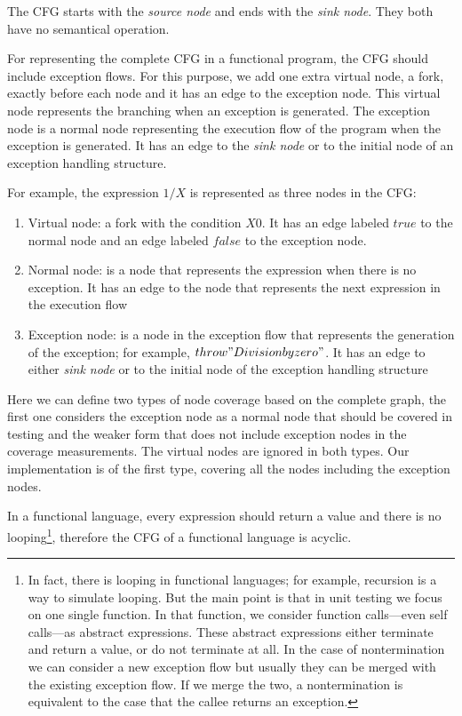 \documentclass[12pt,a4paper]{report}
\begin{document}
The CFG starts with the \emph{source node} and ends with the \emph{sink node}. They both have no semantical operation.

For representing the complete CFG in a functional program, the CFG should include exception flows. For this purpose, we add one extra virtual node, a fork, exactly before each node and it has an edge to the exception node. This virtual node represents the branching when an exception is generated. The exception node is a normal node representing the execution flow of the program when the exception is generated. It has an edge to the \emph{sink node} or to the initial node of an exception handling structure. 

For example, the expression $1/X$ is represented as three nodes in the CFG:
\begin{enumerate}
 \item Virtual node: a fork with the condition $X$\neq$0$. It has an edge labeled $true$ to the normal node and an edge labeled $false$ to the exception node.
 \item Normal node: is a node that represents the expression when there is no exception. It has an edge to the node that represents the next expression in the execution flow
 \item Exception node: is a node in the exception flow that represents the generation of the exception; for example, $throw "Division by zero"$. It has an edge to either \emph{sink node} or to the initial node of the exception handling structure
\end{enumerate}

Here we can define two types of node coverage based on the complete graph, the first one considers the exception node as a normal node that should be covered in testing and the weaker form that does not include exception nodes in the coverage measurements. The virtual nodes are ignored in both types. Our implementation is of the first type, covering all the nodes including the exception nodes.

In a functional language, every expression should return a value and there is no looping\footnote{In fact, there is looping in functional languages; for example, recursion is a way to simulate looping. But the main point is that in unit testing we focus on one single function. In that function, we consider function calls---even self calls---as abstract expressions. These abstract expressions either terminate and return a value, or do not terminate at all. In the case of nontermination we can consider a new exception flow but usually they can be merged with the existing exception flow. If we merge the two, a nontermination is equivalent to the case that the callee returns an exception.}, therefore the CFG of a functional language is acyclic.
\end{document}
